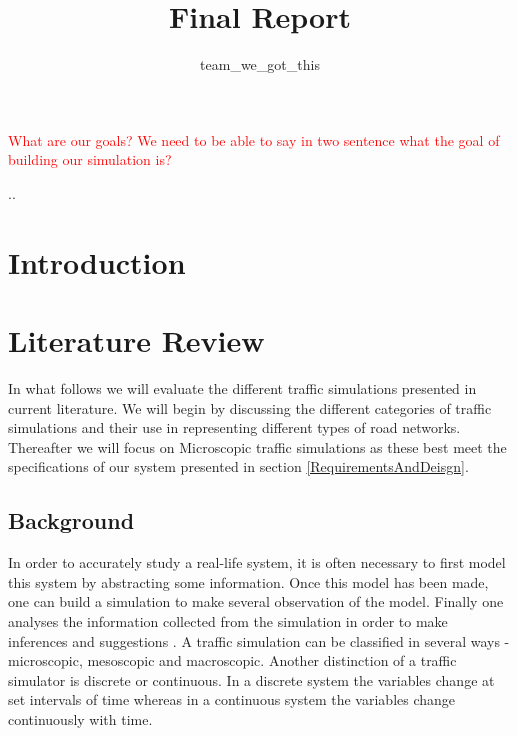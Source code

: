 \documentclass{article}
\begin{document}
\title{Final Report}
\author{team\_we\_got\_this}
\maketitle
\thispagestyle{plain}
\graphicspath{ {Images/} }

\tableofcontents
\listoffigures
\listoftables
\vspace{2cm}
\textcolor{red}{What are our goals? We need to be able to say in two sentence what the goal of building our simulation is? }

\pagebreak
..\section*{Introduction}

\section{Literature Review}
	
	\noindent
	In what follows we will evaluate the different traffic simulations presented in current literature. We will begin by discussing the different categories of traffic simulations and their use in representing different types of road networks. Thereafter we will focus on Microscopic traffic simulations as these best meet the specifications of our system presented in section \ref{RequirementsAndDeisgn}.
	
	\subsection{Background}
	
	In order to accurately study a real-life system, it is often necessary to first model this system by abstracting some information. Once this model has been made, one can build a simulation to make several observation of the model. Finally one analyses the information collected from the simulation in order to make inferences and suggestions \cite{sokolowski2011principles}. A traffic simulation can be classified in several ways - microscopic, mesoscopic and macroscopic. Another distinction of a traffic simulator is discrete or continuous. In a discrete system the variables change at set intervals of time whereas in a continuous system the variables change continuously with time. 
	
\end{document}
